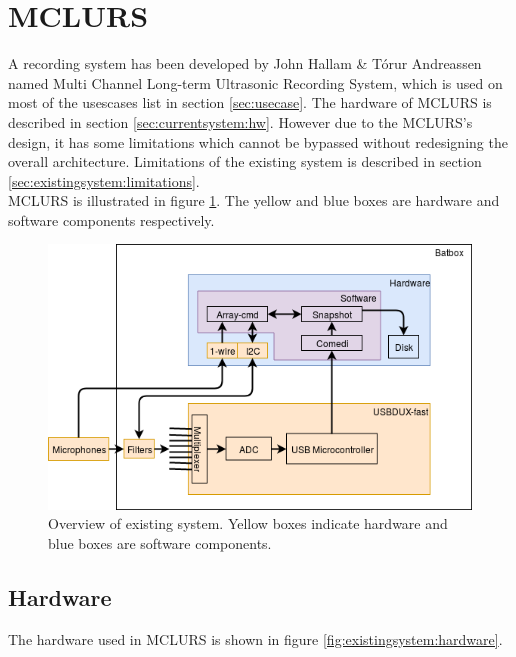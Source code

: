 \section{MCLURS}

A recording system has been developed by John Hallam \& T{\'o}rur Andreassen \citep{andreassen2013ultrasonic} named Multi Channel Long-term Ultrasonic Recording System, which is used on most of the usescases list in section \ref{sec:usecase}. The hardware of MCLURS is described in section \ref{sec:currentsystem:hw}. 
However due to the MCLURS's design, it has some limitations which cannot be bypassed without redesigning the overall architecture. Limitations of the existing system is described in section \ref{sec:existingsystem:limitations}.\\


MCLURS is illustrated in figure \ref{fig:existingsystem:overview}. The yellow and blue boxes are hardware and software components respectively.
\begin{figure}[h!]
	\centering
	\includegraphics[width=1\textwidth]{figures/existing-system-overview.png} 
	\caption{Overview of existing system. Yellow boxes indicate hardware and blue boxes are software components.}\label{fig:existingsystem:overview}
\end{figure}


\subsection{Hardware}
The hardware used in MCLURS is shown in figure \ref{fig:existingsystem:hardware}.

